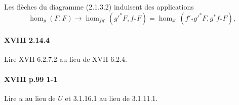 Les flèches du diagramme (2.1.3.2) induisent des applications 
\[
  \hom_y(F,F) \to \hom_{f g'}({g'}^\ast F,f_\ast F) = \hom_{x'}(f'_\ast {g'}^\ast F,g^\ast f_\ast F) \text{,}
\]

\paragraph*{XVIII 2.14.4}
Lire XVII 6.2.7.2 au lieu de XVII 6.2.4.

\paragraph*{XVIII p.99 1-1}
Lire $u$ au lieu de $U$ et 3.1.16.1 au lieu de 3.1.11.1.

